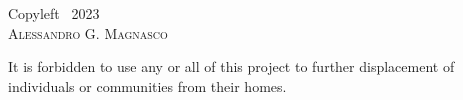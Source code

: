\phantom{}\vspace{\fill}
\begin{center}
Copyleft ~2023\\
\textsc{Alessandro G. Magnasco}\\
\doclicenseThis
\end{center}
It is forbidden to use any or all of this project to further displacement of individuals or communities from their homes.
